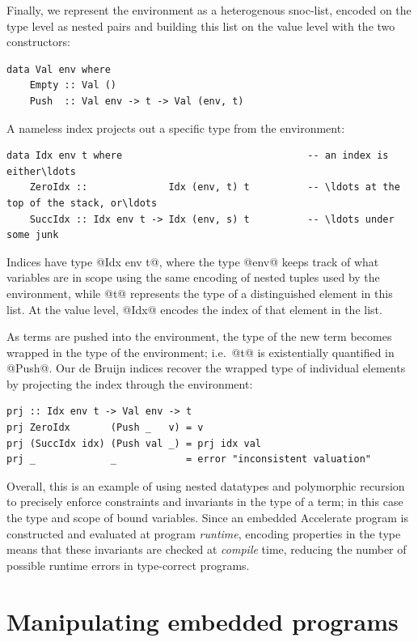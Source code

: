 Finally, we represent the environment as a heterogenous snoc-list, encoded on
the type level as nested pairs and building this list on the value level with
the two constructors:
%
\begin{lstlisting}[style=haskell]
data Val env where
    Empty :: Val ()
    Push  :: Val env -> t -> Val (env, t)
\end{lstlisting}
%
A nameless  index projects out a specific type from the
environment:
%
\begin{lstlisting}[style=haskell]
data Idx env t where                                -- an index is either\ldots
    ZeroIdx ::              Idx (env, t) t          -- \ldots at the top of the stack, or\ldots
    SuccIdx :: Idx env t -> Idx (env, s) t          -- \ldots under some junk
\end{lstlisting}
%
Indices have type @Idx env t@, where the type @env@ keeps track of what
variables are in scope using the same encoding of nested tuples used by the
environment, while @t@ represents the type of a distinguished element in this
list. At the value level, @Idx@ encodes the index of that element in the list.

As terms are pushed into the environment, the type of the new term becomes
wrapped in the type of the environment; i.e.\ @t@ is existentially quantified in
@Push@. Our de Bruijn indices recover the wrapped type of individual elements by
projecting the index through the environment:
%
\begin{lstlisting}[style=haskell]
prj :: Idx env t -> Val env -> t
prj ZeroIdx       (Push _   v) = v
prj (SuccIdx idx) (Push val _) = prj idx val
prj _             _            = error "inconsistent valuation"
\end{lstlisting}

Overall, this is an example of using nested datatypes and polymorphic recursion
to precisely enforce constraints and invariants in the type of a term; in this
case the type and scope of bound variables. Since an embedded Accelerate program is
constructed and evaluated at program \emph{runtime}, encoding properties in the
type means that these invariants are checked at \emph{compile} time, reducing
the number of possible runtime errors in type-correct programs.


\section{Manipulating embedded programs}
\label{sec:manipulating_embedded_programs}


